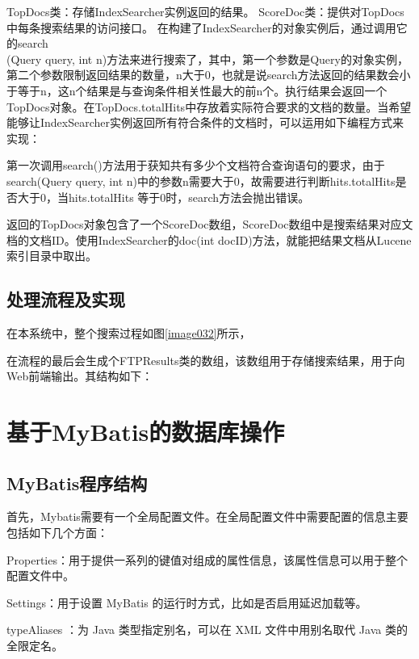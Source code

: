 
TopDocs类：存储IndexSearcher实例返回的结果。
ScoreDoc类：提供对TopDocs中每条搜索结果的访问接口。
在构建了IndexSearcher的对象实例后，通过调用它的search\\(Query query, int n)方法来进行搜索了，其中，第一个参数是Query的对象实例，第二个参数限制返回结果的数量，n大于0，也就是说search方法返回的结果数会小于等于n，这n个结果是与查询条件相关性最大的前n个。执行结果会返回一个TopDocs对象。在TopDocs.totalHits中存放着实际符合要求的文档的数量。当希望能够让Index\-Searcher实例返回所有符合条件的文档时，可以运用如下编程方式来实现：



第一次调用search()方法用于获知共有多少个文档符合查询语句的要求，由于search(Query query, int n)中的参数n需要大于0，故需要进行判断hits.totalHits是否大于0，当hits.totalHits 等于0时，search方法会抛出错误。

返回的TopDocs对象包含了一个ScoreDoc数组，ScoreDoc数组中是搜索结果对应文档的文档ID。使用IndexSearcher的doc(int docID)方法，就能把结果文档从Luc\-ene索引目录中取出。

\subsection{处理流程及实现}
\newpage
在本系统中，整个搜索过程如图\ref{image032}所示，


在流程的最后会生成个FTPResults类的数组，该数组用于存储搜索结果，用于向Web前端输出。其结构如下：



\section{基于MyBatis的数据库操作}
\subsection{MyBatis程序结构}
首先，Mybatis需要有一个全局配置文件。在全局配置文件中需要配置的信息主要包括如下几个方面：

Properties：用于提供一系列的键值对组成的属性信息，该属性信息可以用于整个配置文件中。

Settings：用于设置 MyBatis 的运行时方式，比如是否启用延迟加载等。

typeAliases ：为 Java 类型指定别名，可以在 XML 文件中用别名取代 Java 类的全限定名。

